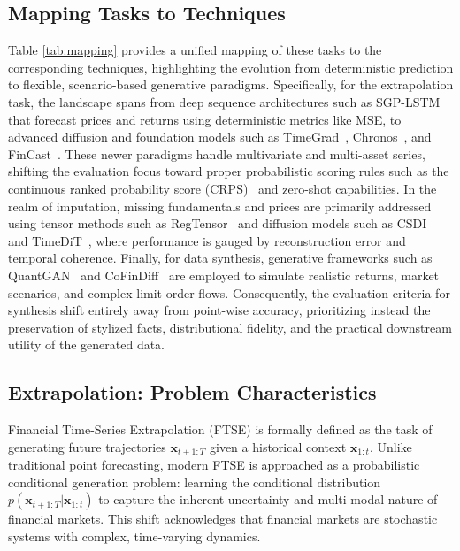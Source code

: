 \documentclass[11pt,a4paper]{article}
\begin{document}
\subsection{Mapping Tasks to Techniques}
Table \ref{tab:mapping} provides a unified mapping of these tasks to the corresponding techniques, highlighting the evolution from deterministic prediction to flexible, scenario-based generative paradigms. Specifically, for the extrapolation task, the landscape spans from deep sequence architectures such as SGP-LSTM~\citep{SGP-LSTM1} that forecast prices and returns using deterministic metrics like MSE, to advanced diffusion and foundation models such as TimeGrad~\citep{rasul2021timegrad}, Chronos~\citep{ansari2024chronos}, and FinCast~\citep{zhu2025fincast}. These newer paradigms handle multivariate and multi-asset series, shifting the evaluation focus toward proper probabilistic scoring rules such as the continuous ranked probability score (CRPS)~\citep{gneiting2007strictly} and zero-shot capabilities. In the realm of imputation, missing fundamentals and prices are primarily addressed using tensor methods such as RegTensor~\citep{zhou2023regtensor} and diffusion models such as CSDI~\citep{tashiro2021csdi} and TimeDiT~\citep{cao2024timedit}, where performance is gauged by reconstruction error and temporal coherence. Finally, for data synthesis, generative frameworks such as QuantGAN~\citep{wiese2020} and CoFinDiff~\citep{tanaka2025cofindiff} are employed to simulate realistic returns, market scenarios, and complex limit order flows. Consequently, the evaluation criteria for synthesis shift entirely away from point-wise accuracy, prioritizing instead the preservation of stylized facts, distributional fidelity, and the practical downstream utility of the generated data.


\subsection{Extrapolation: Problem Characteristics}
\label{sec:extrapolation}

Financial Time-Series Extrapolation (FTSE) is formally defined as the task of generating future trajectories $\mathbf{x}_{t+1:T}$ given a historical context $\mathbf{x}_{1:t}$. Unlike traditional point forecasting, modern FTSE is approached as a probabilistic conditional generation problem: learning the conditional distribution $p(\mathbf{x}_{t+1:T} | \mathbf{x}_{1:t})$ to capture the inherent uncertainty and multi-modal nature of financial markets. This shift acknowledges that financial markets are stochastic systems with complex, time-varying dynamics.
\end{document}
